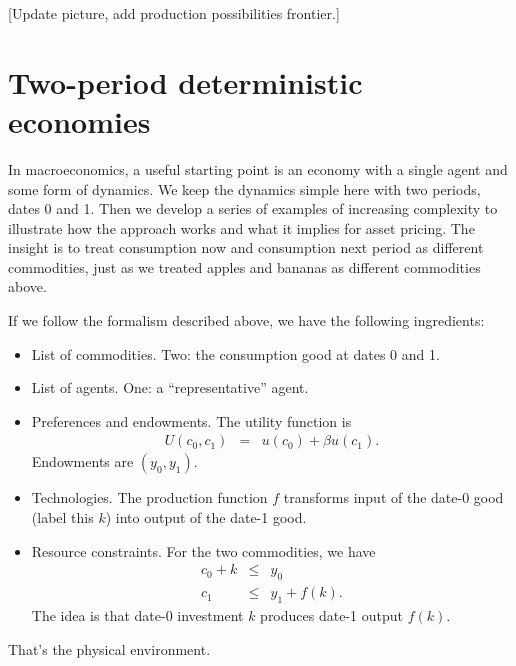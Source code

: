 \documentclass[11pt]{article}
\begin{document}
[Update picture, add production possibilities frontier.]



\section{Two-period deterministic economies}

In macroeconomics, a useful starting point is an
economy with a single agent and some form of dynamics.
We keep the dynamics simple here with two periods,
dates 0 and 1.
Then we develop a series of examples of increasing complexity
to illustrate how the approach works and what it implies for asset pricing.
The insight is to treat consumption now and consumption next period
as different commodities, just as we treated apples and bananas 
as different commodities above.

If we follow the formalism described above, we have the following ingredients:
%
\begin{itemize}
\item List of commodities.  Two:  the consumption good at dates 0 and 1.
\item List of agents.  One: a ``representative'' agent.
\item Preferences and endowments.  The utility function is
\begin{eqnarray*}
    U(c_0,c_1) &=& u(c_0) + \beta u(c_1) .
\end{eqnarray*}
Endowments are $(y_0,y_1)$.
\item Technologies.  The production function $f$ transforms input of the date-0 good
(label this $k$)
into output of the date-1 good.
\item Resource constraints.  For the two commodities,
we have
\begin{eqnarray*}
    c_0 + k &\leq& y_0 \\
    c_1 &\leq&  y_1 + f(k) .
\end{eqnarray*}
The idea is that date-0 investment $k$ produces date-1 output $f(k)$.
\end{itemize}
That's the physical environment.

\end{document}
